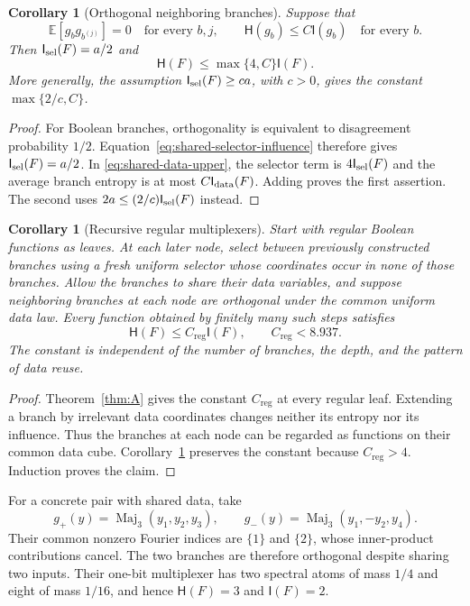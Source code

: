 \documentclass[11pt]{amsart}
\newtheorem{corollary}[theorem]{Corollary}
\theoremstyle{definition}
\theoremstyle{remark}
\newcommand{\E}{\mathbb E}
\newcommand{\HH}{\mathsf H}
\newcommand{\I}{\mathsf I}
\newcommand{\Creg}{C_{\mathrm{reg}}}
\begin{document}
\begin{corollary}[Orthogonal neighboring branches]\label{cor:orthogonal-multiplexers}
Suppose that
\[
 \E[g_b g_{b^{(j)}}]=0\quad\text{for every }b,j,
 \qquad \HH(g_b)\le C\I(g_b)\quad\text{for every }b.
\]
Then $\I_{\rm sel}(F)=a/2$ and
\[
 \HH(F)\le\max\{4,C\}\I(F).
\]
More generally, the assumption $\I_{\rm sel}(F)\ge ca$, with $c>0$,
gives the constant $\max\{2/c,C\}$.
\end{corollary}
\begin{proof}
For Boolean branches, orthogonality is equivalent to disagreement
probability $1/2$. Equation~\eqref{eq:shared-selector-influence} therefore
gives $\I_{\rm sel}(F)=a/2$. In \eqref{eq:shared-data-upper}, the selector
term is $4\I_{\rm sel}(F)$ and the average branch entropy is at most
$C\I_{\rm data}(F)$. Adding proves the first assertion. The second uses
$2a\le(2/c)\I_{\rm sel}(F)$ instead.
\end{proof}

\begin{corollary}[Recursive regular multiplexers]\label{cor:recursive-multiplexers}
Start with regular Boolean functions as leaves. At each later node,
select between previously constructed branches using a fresh uniform
selector whose coordinates occur in none of those branches. Allow the
branches to share their data variables, and suppose neighboring branches
at each node are orthogonal under the common uniform data law. Every
function obtained by finitely many such steps satisfies
\[
 \HH(F)\le\Creg\I(F),\qquad \Creg<8.937.
\]
The constant is independent of the number of branches, the depth, and
the pattern of data reuse.
\end{corollary}
\begin{proof}
Theorem~\ref{thm:A} gives the constant $\Creg$ at every regular leaf.
Extending a branch by irrelevant data coordinates changes neither its
entropy nor its influence. Thus the branches at each node can be regarded
as functions on their common data cube. Corollary~\ref{cor:orthogonal-multiplexers}
preserves the constant because $\Creg>4$. Induction proves the claim.
\end{proof}

For a concrete pair with shared data, take
\[
 g_+(y)=\operatorname{Maj}_3(y_1,y_2,y_3),\qquad
 g_-(y)=\operatorname{Maj}_3(y_1,-y_2,y_4).
\]
Their common nonzero Fourier indices are $\{1\}$ and $\{2\}$, whose
inner-product contributions cancel. The two branches are therefore
orthogonal despite sharing two inputs. Their one-bit multiplexer has
two spectral atoms of mass $1/4$ and eight of mass $1/16$, and hence
$\HH(F)=3$ and $\I(F)=2$.
\end{document}
